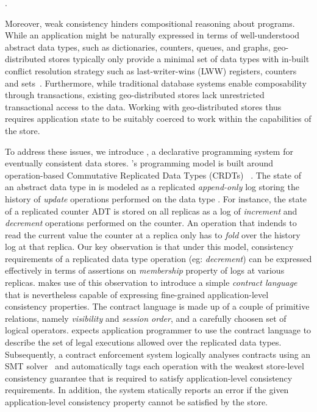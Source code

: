 .

Moreover, weak consistency hinders compositional reasoning about programs.
While an application might be naturally expressed in terms of well-understood
abstract data types, such as dictionaries, counters, queues, and graphs,
geo-distributed stores typically only provide a minimal set of data types with
in-built conflict resolution strategy such as last-writer-wins (LWW) registers,
counters and sets~\cite{Cassandra,DynamoDB}.  Furthermore, while traditional
database systems enable composability through transactions, existing
geo-distributed stores lack unrestricted transactional access to the data.
Working with geo-distributed stores thus requires application state to be
suitably coerced to work within the capabilities of the store.


To address these issues, we introduce \name, a declarative programming system
for eventually consistent data stores. \name's programming model is built around
operation-based Commutative Replicated Data Types (CRDTs) ~\cite{shapiroCRDT}.
The state of an abstract data type in \name is modeled as a replicated
\emph{append-only} log storing the history of \emph{update} operations performed
on the data type . For instance, the state of a replicated counter ADT is stored
on all replicas as a log of \emph{increment} and \emph{decrement} operations
performed on the counter. An operation that indends to read the current value
the counter at a replica only has to \emph{fold} over the history log at that
replica. Our key observation is that under this model, consistency requirements
of a replicated data type operation (eg: \emph{decrement}) can be expressed
effectively in terms of assertions on \emph{membership} property of logs at
various replicas. \name makes use of this observation to introduce a simple
\emph{contract language} that is nevertheless capable of expressing fine-grained
application-level consistency properties.  The contract language is made up of a
couple of primitive relations, namely \emph{visibility} and \emph{session
order}, and a carefully choosen set of logical operators. \name expects
application programmer to use the contract language to describe the set of legal
executions allowed over the replicated data types.  
Subsequently, a contract enforcement system logically analyses contracts using
an SMT solver~\cite{z3} and automatically tags each operation with the weakest
store-level consistency guarantee that is required to satisfy application-level
consistency requirements. In addition, the system statically reports an error if
the given application-level consistency property cannot be satisfied by the
store. 

